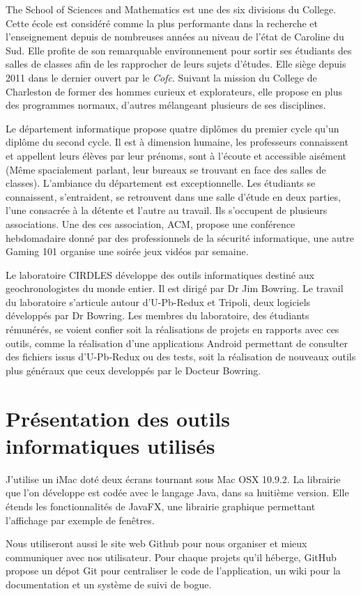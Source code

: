 The School of Sciences and Mathematics est une des six divisions du College. Cette école est considéré comme la plus performante dans la recherche et l’enseignement depuis de nombreuses années au niveau de l’état de Caroline du Sud. Elle profite de son remarquable environnement pour sortir ses étudiants des salles de classes afin de les rapprocher de leurs sujets d’études. Elle siège depuis 2011 dans le dernier ouvert par le \textit{Cofc}. Suivant la mission du College de Charleston de former des hommes curieux et explorateurs, elle propose en plus des programmes normaux, d’autres mélangeant plusieurs de ses disciplines.

Le département informatique propose quatre diplômes du premier cycle  qu’un diplôme du second cycle. Il est à dimension humaine, les professeurs connaissent et appellent leurs élèves par leur prénoms, sont à l’écoute et accessible aisément (Même spacialement parlant, leur bureaux se trouvant en face des salles de classes).
L’ambiance du département est exceptionnelle. Les étudiants se connaissent, s’entraident, se retrouvent dans une salle d’étude en deux parties, l'une consacrée à la détente et l’autre au travail. Ils s'occupent de plusieurs associations. Une des ces association, ACM, propose une conférence hebdomadaire donné par des professionnels de la sécurité informatique, une autre Gaming 101 organise une soirée jeux vidéos par semaine.

Le laboratoire CIRDLES développe des outils informatiques destiné aux geochronologistes du monde entier. Il est dirigé par Dr Jim Bowring. Le travail du laboratoire s’articule autour d’U-Pb-Redux et Tripoli, deux logiciels développés par Dr Bowring. Les membres du laboratoire, des étudiants rémunérés, se voient confier soit la réalisations de projets en rapports avec ces outils, comme la réalisation d’une applications Android permettant de consulter des fichiers issus d’U-Pb-Redux ou des tests, soit la réalisation de nouveaux outils plus généraux que ceux developpés par le Docteur Bowring.

\section{Présentation des outils informatiques utilisés}

J’utilise un iMac doté deux écrans tournant sous Mac OSX 10.9.2. La librairie que l’on développe est codée avec le langage Java, dans sa huitième version. Elle étends les fonctionnalités de JavaFX, une librairie graphique permettant l’affichage par exemple de fenêtres.

Nous utiliseront aussi le site web Github pour nous organiser et mieux communiquer avec nos utilisateur. Pour chaque projets qu'il héberge, GitHub propose un dépot Git pour centraliser le code de l’application, un wiki pour la documentation et un système de suivi de bogue.
